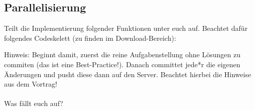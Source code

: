 \subsection{Parallelisierung}
Teilt die Implementierung folgender Funktionen unter euch auf. Beachtet dafür folgendes Codeskelett (zu finden im Download-Bereich):

Hinweis: Beginnt damit, zuerst die reine Aufgabenstellung ohne Lösungen zu commiten (das ist eine Best-Practice!).
Danach committet jede*r die eigenen Änderungen und pusht diese dann auf den Server.
Beachtet hierbei die Hinweise aus dem Vortrag!\\\\
Was fällt euch auf?
